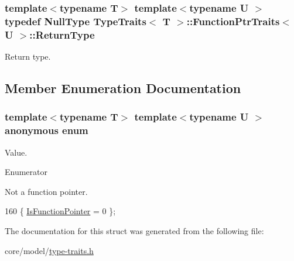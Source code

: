 \subsubsection[{\texorpdfstring{Return\+Type}{ReturnType}}]{\setlength{\rightskip}{0pt plus 5cm}template$<$typename T$>$ template$<$typename U $>$ typedef {\bf Null\+Type} {\bf Type\+Traits}$<$ T $>$\+::{\bf Function\+Ptr\+Traits}$<$ U $>$\+::{\bf Return\+Type}}\hypertarget{structTypeTraits_1_1FunctionPtrTraits_ab22dd11fa966ac0dd3f09b23464a518a}{}\label{structTypeTraits_1_1FunctionPtrTraits_ab22dd11fa966ac0dd3f09b23464a518a}
Return type. 

\subsection{Member Enumeration Documentation}
\subsubsection[{\texorpdfstring{anonymous enum}{anonymous enum}}]{\setlength{\rightskip}{0pt plus 5cm}template$<$typename T$>$ template$<$typename U $>$ anonymous enum}\hypertarget{structTypeTraits_1_1FunctionPtrTraits_a6b28b9e38bb61936ac443fad3b42b2a6}{}\label{structTypeTraits_1_1FunctionPtrTraits_a6b28b9e38bb61936ac443fad3b42b2a6}
Value. \begin{Desc}
\item[Enumerator]\par
\begin{description}
\item[{\em 
Is\+Function\+Pointer\hypertarget{structTypeTraits_1_1FunctionPtrTraits_a6b28b9e38bb61936ac443fad3b42b2a6a55f078e9f7c2767049ff163751e373ca}{}\label{structTypeTraits_1_1FunctionPtrTraits_a6b28b9e38bb61936ac443fad3b42b2a6a55f078e9f7c2767049ff163751e373ca}
}]Not a function pointer. \end{description}
\end{Desc}

\begin{DoxyCode}
160 \{ \hyperlink{structTypeTraits_1_1FunctionPtrTraits_a6b28b9e38bb61936ac443fad3b42b2a6a55f078e9f7c2767049ff163751e373ca}{IsFunctionPointer} = 0    \};
\end{DoxyCode}


The documentation for this struct was generated from the following file\+:\begin{DoxyCompactItemize}
\item 
core/model/\hyperlink{type-traits_8h}{type-\/traits.\+h}\end{DoxyCompactItemize}
